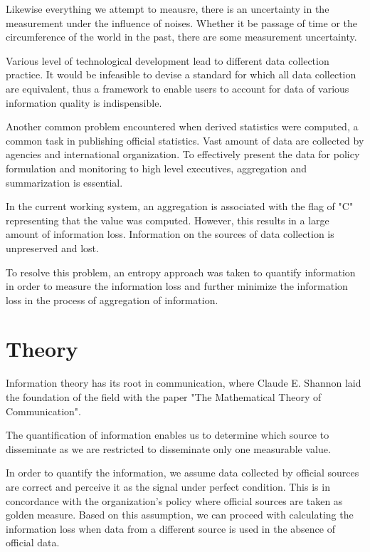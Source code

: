 \documentclass[nojss]{jss}
\begin{document}
Likewise everything we attempt to meausre, there is an uncertainty in
the measurement under the influence of noises. Whether it be passage
of time or the circumference of the world in the past, there are some
measurement uncertainty.

Various level of technological development lead to different data
collection practice. It would be infeasible to devise a standard for
which all data collection are equivalent, thus a framework to enable
users to account for data of various information quality is
indispensible.

Another common problem encountered when derived statistics were
computed, a common task in publishing official statistics.  Vast
amount of data are collected by agencies and international
organization. To effectively present the data for policy formulation
and monitoring to high level executives, aggregation and summarization
is essential. 

In the current working system, an aggregation is associated with the
flag of "C" representing that the value was computed. However, this
results in a large amount of information loss. Information on the
sources of data collection is unpreserved and lost. 


To resolve this problem, an entropy approach was taken to quantify
information in order to measure the information loss and further
minimize the information loss in the process of aggregation of
information.

\section{Theory}

Information theory has its root in communication, where Claude
E. Shannon laid the foundation of the field with the paper "The
Mathematical Theory of Communication". 

The quantification of information enables us to determine which source
to disseminate as we are restricted to disseminate only one measurable
value.

In order to quantify the information, we assume data collected by
official sources are correct and perceive it as the signal under
perfect condition. This is in concordance with the organization's
policy where official sources are taken as golden measure. Based on
this assumption, we can proceed with calculating the information loss
when data from a different source is used in the absence of official
data.
\end{document}
